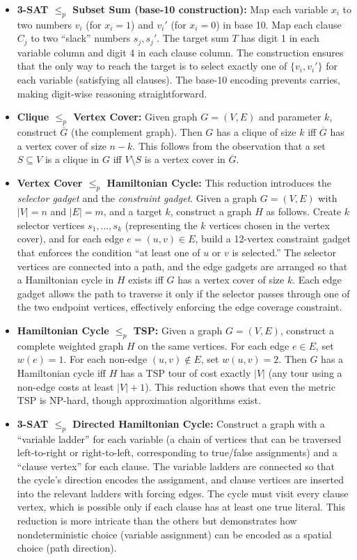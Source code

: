 \begin{itemize}
\item \textbf{3-SAT $\le_p$ Subset Sum (base-10 construction):} Map each variable $x_i$ to two numbers $v_i$ (for $x_i = 1$) and $v_i'$ (for $x_i = 0$) in base 10. Map each clause $C_j$ to two ``slack'' numbers $s_j, s_j'$. The target sum $T$ has digit 1 in each variable column and digit 4 in each clause column. The construction ensures that the only way to reach the target is to select exactly one of $\{v_i, v_i'\}$ for each variable (satisfying all clauses). The base-10 encoding prevents carries, making digit-wise reasoning straightforward.

\item \textbf{Clique $\le_p$ Vertex Cover:} Given graph $G = (V,E)$ and parameter $k$, construct $\overline{G}$ (the complement graph). Then $G$ has a clique of size $k$ iff $\overline{G}$ has a vertex cover of size $n - k$. This follows from the observation that a set $S \subseteq V$ is a clique in $G$ iff $V \setminus S$ is a vertex cover in $\overline{G}$.

\item \textbf{Vertex Cover $\le_p$ Hamiltonian Cycle:} This reduction introduces the \emph{selector gadget} and the \emph{constraint gadget}. Given a graph $G = (V,E)$ with $|V| = n$ and $|E| = m$, and a target $k$, construct a graph $H$ as follows. Create $k$ selector vertices $s_1, \dots, s_k$ (representing the $k$ vertices chosen in the vertex cover), and for each edge $e = (u,v) \in E$, build a 12-vertex constraint gadget that enforces the condition ``at least one of $u$ or $v$ is selected.'' The selector vertices are connected into a path, and the edge gadgets are arranged so that a Hamiltonian cycle in $H$ exists iff $G$ has a vertex cover of size $k$. Each edge gadget allows the path to traverse it only if the selector passes through one of the two endpoint vertices, effectively enforcing the edge coverage constraint.

\item \textbf{Hamiltonian Cycle $\le_p$ TSP:} Given a graph $G = (V,E)$, construct a complete weighted graph $H$ on the same vertices. For each edge $e \in E$, set $w(e) = 1$. For each non-edge $(u,v) \notin E$, set $w(u,v) = 2$. Then $G$ has a Hamiltonian cycle iff $H$ has a TSP tour of cost exactly $|V|$ (any tour using a non-edge costs at least $|V|+1$). This reduction shows that even the metric TSP is NP-hard, though approximation algorithms exist.

\item \textbf{3-SAT $\le_p$ Directed Hamiltonian Cycle:} Construct a graph with a ``variable ladder'' for each variable (a chain of vertices that can be traversed left-to-right or right-to-left, corresponding to true/false assignments) and a ``clause vertex'' for each clause. The variable ladders are connected so that the cycle's direction encodes the assignment, and clause vertices are inserted into the relevant ladders with forcing edges. The cycle must visit every clause vertex, which is possible only if each clause has at least one true literal. This reduction is more intricate than the others but demonstrates how nondeterministic choice (variable assignment) can be encoded as a spatial choice (path direction).


\end{itemize}

